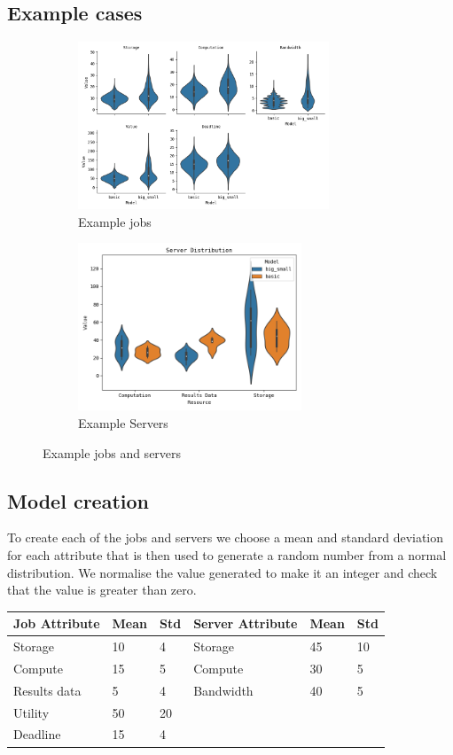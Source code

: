 \subsection{Example cases}\label{subsec:example-cases}
\begin{figure}[H]
    \begin{subfigure}{0.5\textwidth}
        \includegraphics[width=1\linewidth, height=5cm]{./images/job_distribution.png}
        \caption{Example jobs}
    \end{subfigure}
    \begin{subfigure}{0.5\textwidth}
        \includegraphics[width=1\linewidth, height=5cm]{./images/server_distribution.png}
        \caption{Example Servers}
    \end{subfigure}

    \caption{Example jobs and servers}
\end{figure}

\subsection{Model creation}\label{subsec:model-creation}
To create each of the jobs and servers we choose a mean and standard deviation for each attribute that is then
used to generate a random number from a normal distribution.
We normalise the value generated to make it an integer and check that the value is greater than zero. \\

\begin{tabu} to 1\textwidth { | X[l] | X[l] | X[l] | X[l] | X[l] | X[l] | }
\hline
Job Attribute & Mean & Std & Server Attribute & Mean & Std \\
\hline
Storage & 10 & 4 & Storage & 45 & 10 \\
\hline
Compute & 15 & 5 & Compute & 30 & 5 \\
\hline
Results data & 5 & 4 & Bandwidth & 40 & 5 \\
\hline
Utility & 50 & 20 & & & \\
\hline
Deadline & 15 & 4 & & & \\
\hline
\end{tabu}